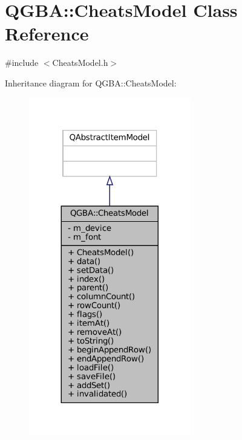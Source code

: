 \hypertarget{class_q_g_b_a_1_1_cheats_model}{}\section{Q\+G\+BA\+:\+:Cheats\+Model Class Reference}
\label{class_q_g_b_a_1_1_cheats_model}


{\ttfamily \#include $<$Cheats\+Model.\+h$>$}



Inheritance diagram for Q\+G\+BA\+:\+:Cheats\+Model\+:
\nopagebreak
\begin{figure}[H]
\begin{center}
\leavevmode
\includegraphics[width=200pt]{class_q_g_b_a_1_1_cheats_model__inherit__graph}
\end{center}
\end{figure}


